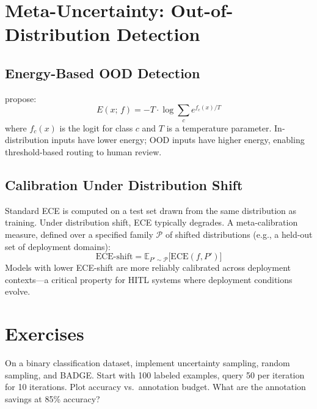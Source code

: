 \section{Meta-Uncertainty: Out-of-Distribution Detection}
\label{sec:a17-ood}

\subsection{Energy-Based OOD Detection}

\textcite{liu2020energy} propose:
\[
E(x;\, f) = -T \cdot \log \sum_c e^{f_c(x)/T}
\]
where $f_c(x)$ is the logit for class $c$ and $T$ is a temperature parameter. In-distribution inputs have lower energy; OOD inputs have higher energy, enabling threshold-based routing to human review.

\subsection{Calibration Under Distribution Shift}

Standard ECE is computed on a test set drawn from the same distribution as training. Under distribution shift, ECE typically degrades. A meta-calibration measure, defined over a specified family $\mathcal{P}$ of shifted distributions (e.g., a held-out set of deployment domains):
\[
\mathrm{ECE\text{-}shift} = \mathbb{E}_{P' \sim \mathcal{P}}\bigl[\mathrm{ECE}(f, P')\bigr]
\]
Models with lower ECE-shift are more reliably calibrated across deployment contexts---a critical property for HITL systems where deployment conditions evolve.

\section{Exercises}
\label{sec:a17-exercises}

\begin{Exercise}
On a binary classification dataset, implement uncertainty sampling, random sampling, and BADGE. Start with 100 labeled examples, query 50 per iteration for 10 iterations. Plot accuracy vs.\ annotation budget. What are the annotation savings at 85\% accuracy?
\end{Exercise}

